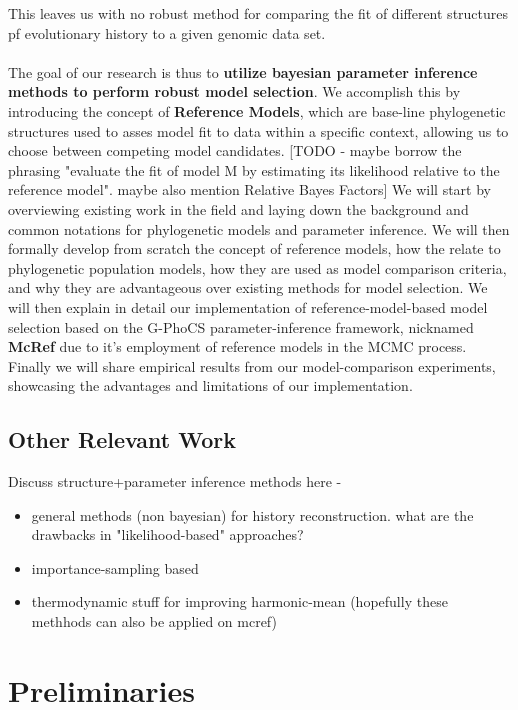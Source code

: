 \documentclass[11pt]{article}
\newcommand{\1}{\mathbbm{1}}
\newcommand{\gp}{G-PhoCS }
\begin{document}
%
This leaves us with no robust method for comparing the fit of different structures pf evolutionary history to a given genomic data set.\\
%
\\
The goal of our research is thus to \textbf{utilize bayesian parameter inference methods to perform robust model selection}.
%
We accomplish this by introducing the concept of \textbf{Reference Models}, which are base-line phylogenetic structures used to asses model fit to data within a specific context, allowing us to choose between competing model candidates. [TODO - maybe borrow the phrasing "evaluate the fit of model M by estimating its likelihood relative to
the reference model". maybe also mention Relative Bayes Factors]
%
We will start by overviewing existing work in the field and laying down the background and common notations for phylogenetic models and parameter inference.
%
We will then formally develop from scratch the concept of reference models, how the relate to phylogenetic population models, how they are used as model comparison criteria, and why they are advantageous over existing methods for model selection. 
%
We will then explain in detail our implementation of reference-model-based model selection based on the \gp parameter-inference framework, nicknamed \textbf{McRef} due to it's employment of reference models in the MCMC process.
%
Finally we will share empirical results from our model-comparison experiments, showcasing the advantages and limitations of our implementation.

\subsection{Other Relevant Work}

Discuss structure+parameter inference methods here - 

\begin{itemize}
\item general methods (non bayesian) for history reconstruction. what are the drawbacks in "likelihood-based" approaches?

\item importance-sampling based

\item thermodynamic stuff for improving harmonic-mean (hopefully these methhods can also be applied on mcref)

\end{itemize}

\section{Preliminaries}
\end{document}
